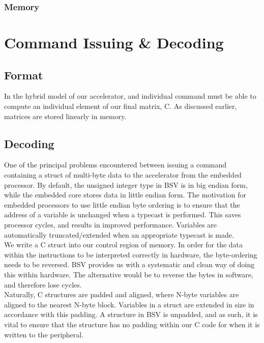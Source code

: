 \documentclass[a4paper,8pt]{report}
\begin{document}
\subsubsection{Memory}

\section{Command Issuing \& Decoding}
\subsection{Format}
In the hybrid model of our accelerator, and individual command must be able to
compute an individual element of our final matrix, C. As discussed earlier,
matrices are stored linearly in memory. 


\subsection{Decoding}
One of the principal problems encountered between issuing a command containing
a struct of multi-byte data to the accelerator from the embedded processor. By
default, the unsigned integer type in BSV is in big endian form, while the
embedded core stores data in little endian form. The motivation for embedded
processors to use little endian byte ordering is to ensure that the address of a
variable is unchanged when a typecast is performed. This saves processor cycles,
and results in improved performance. Variables are automatically
truncated/extended when an appropriate typecast is made. \\

We write a C struct into our control region of memory. In order for the data
within the instructions to be interpreted correctly in hardware, the
byte-ordering needs to be reversed. BSV provides us with a systematic and clean
way of doing this within hardware. The alternative would be to reverse the bytes
in software, and therefore lose cycles. \\


Naturally, C structures are padded and aligned, where N-byte variables are
aligned to the nearest N-byte block. Variables in a struct are extended in size
in accordance with this padding. A structure in BSV is unpadded, and as such, it
is vital to ensure that the structure has no padding within our C code for when
it is written to the peripheral.
\end{document}

